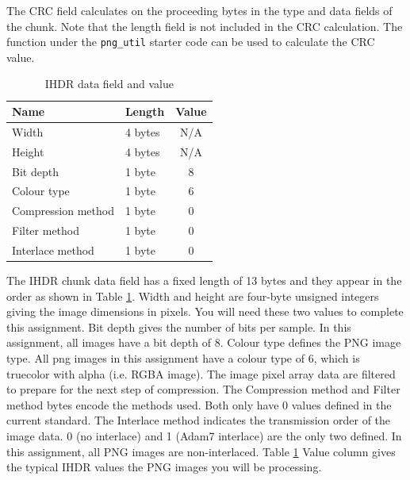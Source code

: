 The CRC field calculates on the proceeding bytes in the type and data fields of the chunk. Note that the length field is not included in the CRC calculation. The  function under the \verb+png_util+ starter code can be used to calculate the CRC value.
\begin{table}
	\begin{center}
		\begin{tabular}{llc}             \toprule
			Name               & Length  & Value \\ \midrule
			Width              & 4 bytes & N/A\\ \midrule
			Height             & 4 bytes & N/A\\ \midrule
			Bit depth          & 1 byte  & 8\\ \midrule
			Colour type        & 1 byte  & 6\\ \midrule
			Compression method & 1 byte  & 0\\ \midrule
			Filter method      & 1 byte  & 0\\ \midrule
			Interlace method   & 1 byte  & 0\\ \bottomrule
		\end{tabular}
		\caption{IHDR data field and value}
		\label{lab1:tb_IHDR_Data}
	\end{center}
\end{table}
The IHDR chunk data field has a fixed length of 13 bytes and they appear in the order as shown in Table \ref{lab1:tb_IHDR_Data}. Width and height are four-byte unsigned integers giving the image dimensions in pixels. You will need these two values to complete this assignment. Bit depth gives the number of bits per sample. In this assignment, all images have a bit depth of 8. Colour type defines the PNG image type. All png images in this assignment have a colour type of 6, which is truecolor with alpha (i.e. RGBA image). The image pixel array data are filtered to prepare for the next step of compression. The Compression method and Filter method bytes encode the methods used. Both only have 0 values defined in the current standard. The Interlace method indicates the transmission order of the image data. 0 (no interlace) and 1 (Adam7 interlace) are the only two defined. In this assignment, all PNG images are non-interlaced. Table \ref{lab1:tb_IHDR_Data} Value column gives the typical IHDR values the PNG images you will be processing.  

